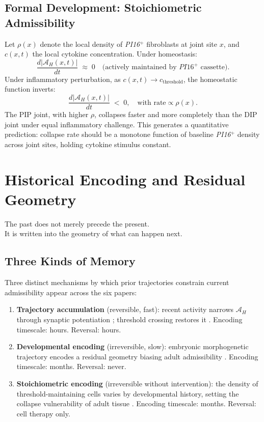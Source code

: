 \documentclass[12pt, a4paper, twoside]{book}
\theoremstyle{definition}
\theoremstyle{remark}
\newcommand{\Adm}{\mathcal{A}}
\newcommand{\term}[1]{\textbf{#1}}
\newcommand{\gene}[1]{\textit{#1}}
\begin{document}
\section{Formal Development: Stoichiometric Admissibility}

Let $\rho(x)$ denote the local density of \gene{PI16}$^+$ fibroblasts at joint site $x$, and $c(x,t)$ the local cytokine concentration. Under homeostasis:
\begin{equation}
  \frac{d|\Adm_H(x,t)|}{dt} \;\approx\; 0 \quad \text{(actively maintained by }\gene{PI16}^+\text{ cassette)}.
\end{equation}
Under inflammatory perturbation, as $c(x,t) \to c_{\mathrm{threshold}}$, the homeostatic function inverts:
\begin{equation}
  \frac{d|\Adm_H(x,t)|}{dt} \;<\; 0, \quad \text{with rate} \propto \rho(x).
\end{equation}
The PIP joint, with higher $\rho$, collapses faster and more completely than the DIP joint under equal inflammatory challenge. This generates a quantitative prediction: collapse rate should be a monotone function of baseline \gene{PI16}$^+$ density across joint sites, holding cytokine stimulus constant.

\chapter{Historical Encoding and Residual Geometry}
\label{ch:historical}

\epigraph{The past does not merely precede the present.\\
  It is written into the geometry of what can happen next.}{}

\section{Three Kinds of Memory}

Three distinct mechanisms by which prior trajectories constrain current admissibility appear across the six papers:

\begin{enumerate}
  \item \term{Trajectory accumulation} (reversible, fast): recent activity narrows $\Adm_H$ through synaptic potentiation \citep{tononi2014}; threshold crossing restores it \citep{driessen2026}. Encoding timescale: hours. Reversal: hours.

  \item \term{Developmental encoding} (irreversible, slow): embryonic morphogenetic trajectory encodes a residual geometry biasing adult admissibility \citep{davidson2026}. Encoding timescale: months. Reversal: never.

  \item \term{Stoichiometric encoding} (irreversible without intervention): the density of threshold-maintaining cells varies by developmental history, setting the collapse vulnerability of adult tissue \citep{davidson2026}. Encoding timescale: months. Reversal: cell therapy only.
\end{enumerate}
\end{document}
